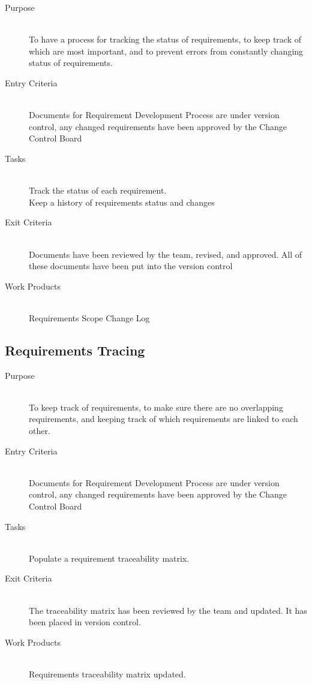 \documentclass[11pt]{article}
\begin{document}
\begin{description}

\item[Purpose] \hfill \\
To have a process for tracking the status of requirements, to keep track of which are most important, and to prevent errors from constantly changing status of requirements.


\item[Entry Criteria]\hfill \\
Documents for Requirement Development Process are under version control, any changed requirements have been approved by the Change Control Board

\item[Tasks]\hfill \\
Track the status of each requirement.\\
Keep a history of requirements status and changes\\


\item[Exit Criteria]\hfill \\
Documents have been reviewed by the team, revised, and approved. All of these documents have been put into the version control

\item[Work Products]\hfill \\
Requirements Scope Change Log


\end{description}

\newpage

\subsection{Requirements Tracing} 

\begin{description}

\item[Purpose] \hfill \\
To keep track of requirements, to make sure there are no overlapping requirements, and keeping track of which requirements are linked to each other.

\item[Entry Criteria]\hfill \\
Documents for Requirement Development Process are under version control, any changed requirements have been approved by the Change Control Board

\item[Tasks]\hfill \\
Populate a requirement traceability matrix.

\item[Exit Criteria]\hfill \\
The traceability matrix has been reviewed by the team and 
updated. It has been placed in version control.

\item[Work Products]\hfill \\
Requirements traceability matrix updated.

\end{description}
   
\end{document}
